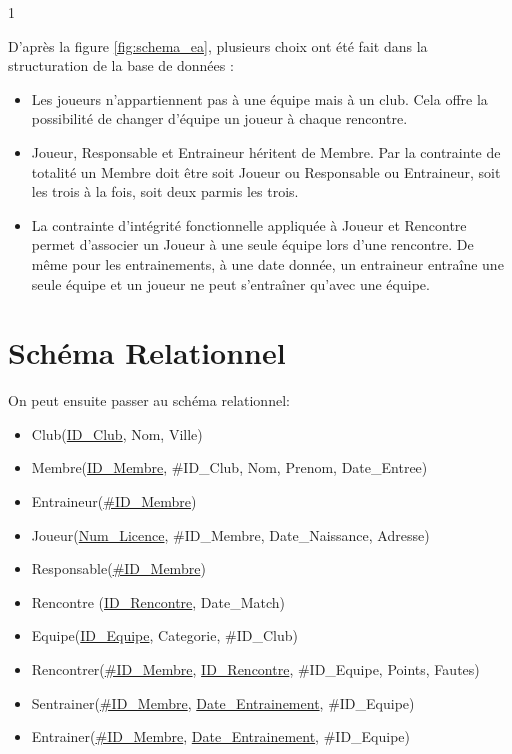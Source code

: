 1\documentclass[a4paper»,8pt,french,fleqn]{report}
\begin{document}
D'après la figure \ref{fig:schema_ea}, plusieurs choix ont été fait dans la structuration de la base de données : \\

\begin{itemize}

\item Les joueurs n'appartiennent pas à une équipe mais à un club. Cela offre la possibilité de changer d'équipe un joueur à chaque rencontre. \\

\item Joueur, Responsable et Entraineur héritent de Membre. Par la contrainte de totalité un Membre doit être soit Joueur ou Responsable ou Entraineur, soit les trois à la fois, soit deux parmis les trois. \\

\item La contrainte d'intégrité fonctionnelle appliquée à Joueur et Rencontre permet d'associer un Joueur à une seule équipe lors d'une rencontre. De même pour les entrainements, à une date donnée, un entraineur entraîne une seule équipe et un joueur ne peut s'entraîner qu'avec une équipe.

\end{itemize}

\section{Schéma Relationnel}

On peut ensuite passer au schéma relationnel: \\

\begin{itemize}

\item Club(\underline{ID\_Club}, Nom, Ville)  
\item Membre(\underline{ID\_Membre}, \#ID\_Club, Nom, Prenom, Date\_Entree) 
\item Entraineur(\underline{\#ID\_Membre}) 
\item Joueur(\underline{Num\_Licence}, \#ID\_Membre, Date\_Naissance, Adresse) 
\item Responsable(\underline{\#ID\_Membre}) 
\item Rencontre (\underline{ID\_Rencontre}, Date\_Match) 
\item Equipe(\underline{ID\_Equipe}, Categorie, \#ID\_Club) 
\item Rencontrer(\underline{\#ID\_Membre}, \underline{ID\_Rencontre}, \#ID\_Equipe, Points, Fautes) 
\item Sentrainer(\underline{\#ID\_Membre}, \underline{Date\_Entrainement}, \#ID\_Equipe) 
\item Entrainer(\underline{\#ID\_Membre}, \underline{Date\_Entrainement}, \#ID\_Equipe) 

\end{itemize}
\end{document}
